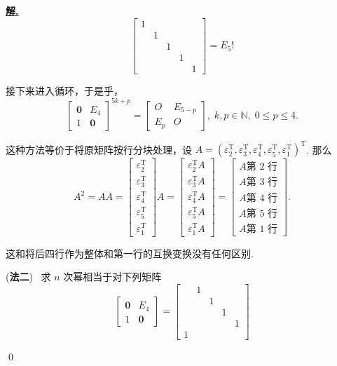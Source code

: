 \documentclass[10pt,openany]{article}
\theoremstyle{thmstyle} %
\theoremstyle{defstyle} %
\theoremstyle{prostyle} %
\theoremstyle{exastyle}
\theoremstyle{remstyle}
\newenvironment{solution}{\par\underline{\textbf{解.}} \;\fangsong}{\qed\par}
\newcommand{\T}{^{\text{T}}}
\begin{document}
\begin{solution}
\[\begin{bmatrix}
	1 & & & & \\
	& 1  & & & \\
	&  & 1 & & \\
	&  & & 1 & \\
	&  & & & 1 
	\end{bmatrix}=E_5! \]
	
	接下来进入循环，于是乎，
	\[ \begin{bmatrix}
		\bm{0} & E_4 \\ 1 & \bm{0}
	\end{bmatrix}^{5k+p}= \begin{bmatrix}
	O & E_{5-p} \\ E_p & O
	\end{bmatrix}, \; k,p \in \mathbb{N}, \; 0 \leq p \leq 4. \]
	
	这种方法等价于将原矩阵按行分块处理，设 \( A=(\varepsilon_2\T,\varepsilon_3\T,\varepsilon_4\T,\varepsilon_5\T,\varepsilon_1\T)\T \). 那么
	\[ A^2=AA= \begin{bmatrix}
		\varepsilon_2\T \\[1ex] \varepsilon_3\T \\[1ex] \varepsilon_4\T \\[1ex] \varepsilon_5\T \\[1ex] \varepsilon_1\T
	\end{bmatrix}A=\begin{bmatrix}
	\varepsilon_2\T A \\[1ex] \varepsilon_3\T A \\[1ex] \varepsilon_4\T A \\[1ex] \varepsilon_5\T A \\[1ex] \varepsilon_1\T A
	\end{bmatrix}=\begin{bmatrix}
	A \text{第 2 行} \\ A \text{第 3 行} \\ A \text{第 4 行} \\ A \text{第 5 行} \\ A \text{第 1 行}
	\end{bmatrix}.  \] 
	
	这和将后四行作为整体和第一行的互换变换没有任何区别.
	
	\vspace{2ex}
	
	(\textbf{法二}) \ 求 \( n \) 次幂相当于对下列矩阵
	\[ \begin{bmatrix}
		\bm{0} & E_4 \\ 1 & \bm{0}
	\end{bmatrix}=\begin{bmatrix}
		& 1  & & & \\
		&  & 1 & & \\
		&  & & 1 & \\
		&  & & & 1 \\
		1 & & & & 
	\end{bmatrix} \]
	

\end{solution}
\end{document}
